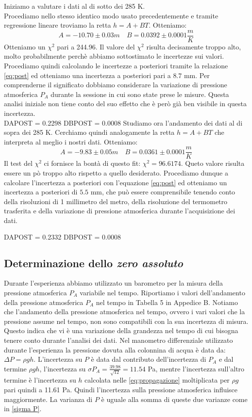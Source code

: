 Iniziamo a valutare i dati al di sotto dei 285 K.\\
Procediamo nello stesso identico modo usato precedentemente e tramite regressione lineare troviamo la retta $h = A+BT$.
Otteniamo:
\[A = -10.70 \pm 0.03 m \quad  B = 0.0392 \pm 0.0001\frac{m}{K}\]
Otteniamo un $\chi^2$ pari a 244.96. 
Il valore del $\chi^2$ risulta decisamente troppo alto, molto probabilmente perchè abbiamo sottostimato le incertezze sui valori.
Procediamo quindi calcolando le incertezze a posteriori tramite la relazione \eqref{eq:post} ed otteniamo una incertezza a posteriori pari a $ 8.7 $ mm. 
Per comprenderne il significato dobbiamo considerare la variazione di pressione atmosferica $P_A$ durante la sessione in cui sono state prese le misure. 
Questa analisi iniziale non tiene conto del suo effetto che è però già ben visibile in questa incertezza.\\
DAPOST = 0.2298
DBPOST = 0.0008
\newline
Studiamo ora l'andamento dei dati al di sopra dei 285 K. 
Cerchiamo quindi analogamente la retta $h = A+BT$ che interpreta al meglio i nostri dati. 
Otteniamo:
\[A = -9.83 \pm 0.05 m \quad  B = 0.0361 \pm 0.0001\frac{m}{K}\]
Il test del $\chi^2$ ci fornisce la bontà di questo fit: $\chi^2 = 96.6174 $. 
Queto valore risulta essere un pò troppo alto rispetto a quello desiderato. 
Procediamo dunque a calcolare l'incertezza a posteriori con l'equazione \eqref{eq:post} ed otteniamo un incertezza a posteriori di $ 5.5 $ mm, che può essere comprensibile tenendo conto della risoluzioni di 1 millimetro del metro, della risoluzione del termometro trasferita e della variazione di pressione atmosferica durante l'acquisizione dei dati.

DAPOST = 0.2332
DBPOST = 0.0008
\subsection{Determinazione dello \emph{zero assoluto}}
Durante l'esperienza abbiamo utilizzato un barometro per la misura della pressione atmosferica $P_A$ variabile nel tempo. 
Riportiamo i valori dell'andamento della pressione atmosferica $P_A$ nel tempo in Tabella 5 in Appedice B.
Notiamo che l'andamento della pressione atmosferica nel tempo, ovvero i vari valori che la pressione assume nel tempo, non sono compatibili con la sua incertezza di misura.
Questo indica che vi è una variazione della grandezza nel tempo di cui bisogna tenere conto durante l'analisi dei dati.
Nel manometro differenziale utilizzato durante l'esperienza la pressione dovuta alla colonnina di acqua è data da: $\Delta P = \rho gh$. 
L'incertezza su $P$ è data dal contributo dell'incertezza di $P_A$ e dal termine $\rho gh$, l'incertezza su $\sigma P_A = \frac{39.98}{\sqrt{12}} = 11.54$ Pa, mentre l'incertezza sull'altro termine è l'incertezza su $h$ calcolata nelle \eqref{eq:propagazione} moltiplicata per $\rho g$ pari quindi a 11.61 Pa.  
Quindi l'incertezza sulla pressione atmosferica influisce maggiormente.
La varianza di $P$ è uguale alla somma di queste due varianze come in \eqref{sigma P}.


